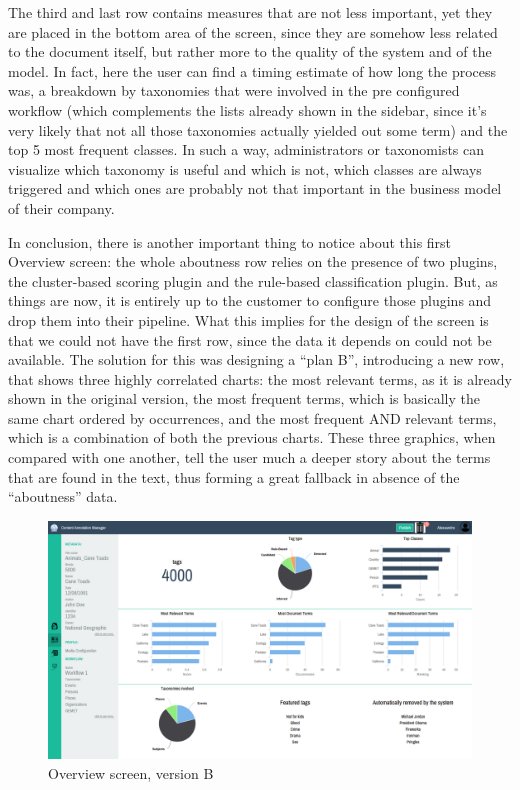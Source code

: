 \documentclass[12pt,oneside,svgnames]{memoir}
\begin{document}
The third and last row contains measures that are not less important,
yet they are placed in the bottom area of the screen, since they are
somehow less related to the document itself, but rather more to the
quality of the system and of the model. In fact, here the user can find
a timing estimate of how long the process was, a breakdown by taxonomies
that were involved in the pre configured workflow (which complements the
lists already shown in the sidebar, since it's very likely that not all
those taxonomies actually yielded out some term) and the top 5 most
frequent classes. In such a way, administrators or taxonomists can
visualize which taxonomy is useful and which is not, which classes are
always triggered and which ones are probably not that important in the
business model of their company.

In conclusion, there is another important thing to notice about this
first Overview screen: the whole aboutness row relies on the presence of
two plugins, the cluster-based scoring plugin and the rule-based
classification plugin. But, as things are now, it is entirely up to the
customer to configure those plugins and drop them into their pipeline.
What this implies for the design of the screen is that we could not have
the first row, since the data it depends on could not be available. The
solution for this was designing a ``plan B'', introducing a new row,
that shows three highly correlated charts: the most relevant terms, as
it is already shown in the original version, the most frequent terms,
which is basically the same chart ordered by occurrences, and the most
frequent AND relevant terms, which is a combination of both the previous
charts. These three graphics, when compared with one another, tell the
user much a deeper story about the terms that are found in the text,
thus forming a great fallback in absence of the ``aboutness'' data.

\begin{figure}[htbp]
\centering
\includegraphics{./src/img/overview-B.png}
\caption{Overview screen, version B}
\end{figure}
\end{document}
